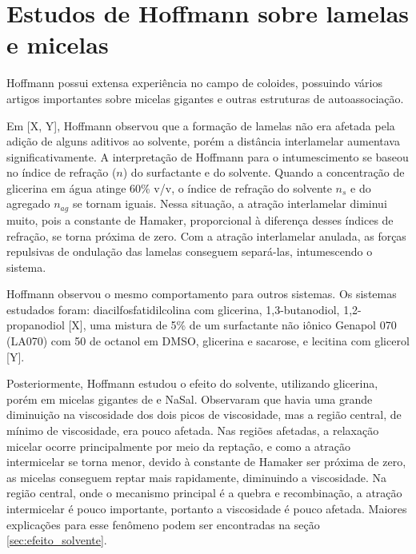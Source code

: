 		\section{Estudos de Hoffmann sobre lamelas e micelas}
		Hoffmann possui extensa experiência no campo de coloides, possuindo vários artigos importantes sobre micelas gigantes e outras estruturas de autoassociação.
		
		Em [X, Y], Hoffmann observou que a formação de lamelas não era afetada pela adição de alguns aditivos ao solvente, porém a distância interlamelar aumentava significativamente. A interpretação de Hoffmann para o intumescimento se baseou no índice de refração (\(n\)) do surfactante e do solvente. Quando a concentração de glicerina em água atinge 60\% v/v, o índice de refração do solvente \(n_s\) e do agregado \(n_{ag}\) se tornam iguais. Nessa situação, a atração interlamelar diminui muito, pois a constante de Hamaker, proporcional à diferença desses índices de refração, se torna próxima de zero. Com a atração interlamelar anulada, as forças repulsivas de ondulação das lamelas conseguem separá-las, intumescendo o sistema.
		
		Hoffmann observou o mesmo comportamento para outros sistemas. Os sistemas estudados foram: diacilfosfatidilcolina com glicerina, 1,3-butanodiol, 1,2-propanodiol [X], uma mistura de 5\% de um surfactante não iônico Genapol 070 (LA070) com 50\mM{} de octanol em DMSO, glicerina e sacarose, e lecitina com glicerol [Y].
		
		
		
		Posteriormente, Hoffmann estudou o efeito do solvente, utilizando glicerina, porém em micelas gigantes de \CTAB{} e NaSal. Observaram que havia uma grande diminuição na viscosidade dos dois picos de viscosidade, mas a região central, de mínimo de viscosidade, era pouco afetada. Nas regiões afetadas, a relaxação micelar ocorre principalmente por meio da reptação, e como a atração intermicelar se torna menor, devido à constante de Hamaker ser próxima de zero, as micelas conseguem reptar mais rapidamente, diminuindo a viscosidade. Na região central, onde o mecanismo principal é a quebra e recombinação, a atração intermicelar é pouco importante, portanto a viscosidade é pouco afetada. Maiores explicações para esse fenômeno podem ser encontradas na seção \ref{sec:efeito_solvente}.
		
